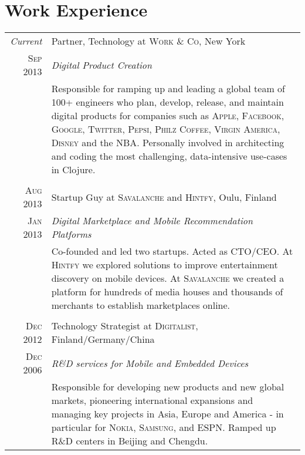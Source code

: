 \documentclass[a4paper,10pt]{article}
\begin{document}
\section{Work Experience}
\begin{tabular}{r|p{11cm}}
  \emph{Current} & Partner, Technology at \textsc{Work \& Co}, New York \\

  \textsc{Sep 2013} & \emph{Digital Product Creation}\\

  &\footnotesize{Responsible for ramping up and leading a global team of 100+
    engineers who plan, develop, release, and maintain digital products for
    companies such as \textsc{Apple}, \textsc{Facebook}, \textsc{Google},
    \textsc{Twitter}, \textsc{Pepsi}, \textsc{Philz Coffee}, \textsc{Virgin
      America}, \textsc{Disney} and the \textsc{NBA}. Personally involved in
    architecting and coding the most challenging, data-intensive use-cases in
    Clojure.}\\

  \multicolumn{2}{c}{}\\

  \textsc{Aug 2013} & Startup Guy at \textsc{Savalanche} and \textsc{Hintfy}, Oulu, Finland \\

  \textsc{Jan 2013} & \emph{Digital Marketplace and Mobile Recommendation Platforms} \\

  &\footnotesize{Co-founded and led two startups. Acted as \textsc{CTO/CEO}. At
    \textsc{Hintfy} we explored solutions to improve entertainment discovery on
    mobile devices. At \textsc{Savalanche} we created a platform for hundreds of
    media houses and thousands of merchants to establish marketplaces online.}\\

  \multicolumn{2}{c}{}\\

  \textsc{Dec 2012} & Technology Strategist at \textsc{Digitalist},
  Finland/Germany/China \\

  \textsc{Dec 2006} & \emph{R\&D services for Mobile and Embedded Devices} \\

  &\footnotesize{Responsible for developing new products and new global markets,
    pioneering international expansions and managing key projects in Asia,
    Europe and America - in particular for \textsc{Nokia}, \textsc{Samsung}, and
    \textsc{ESPN}. Ramped up R\&D centers in Beijing and Chengdu.}\\


\end{tabular}
\end{document}
